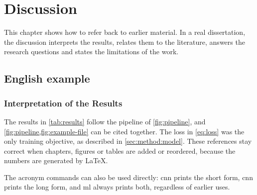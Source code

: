 \chapter{Discussion}
\label{chap:discussion}

This chapter shows how to refer back to earlier material. In a real
dissertation, the discussion interprets the results, relates them to the
literature, answers the research questions and states the limitations of the
work.

\section{English example}
\label{sec:discussion:en}

\subsection{Interpretation of the Results}
\label{sec:discussion:interpretation}

The results in \cref{tab:results} follow the pipeline of \cref{fig:pipeline},
and \cref{fig:pipeline,fig:example-file} can be cited together. The loss in
\cref{eq:loss} was the only training objective, as described in
\cref{sec:method:model}. These references stay correct when chapters,
figures or tables are added or reordered, because the numbers are generated
by \LaTeX.

The acronym commands can also be used directly: \acrshort{cnn} prints the
short form, \acrlong{cnn} prints the long form, and \acrfull{ml} always
prints both, regardless of earlier uses.

